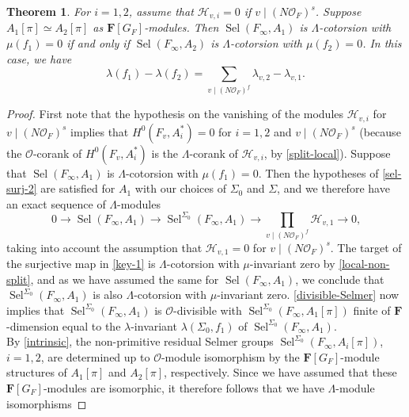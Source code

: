 \documentclass[12 pt]{amsart}
\theoremstyle{plain}
\newtheorem{thm}{Theorem}[section]
\theoremstyle{definition}
\numberwithin{equation}{section}
\numberwithin{table}{section}
\begin{document}
\begin{thm}
\label{main}
For $i=1,2$, assume that $\mathcal{H}_{v,i}=0$ if $v\mid(N\mathscr{O}_F)^s$. Suppose $A_1[\pi]\simeq A_2[\pi]$ as $\mathbf{F}[G_F]$-modules. Then $\operatorname{Sel}(F_\infty,A_1)$ is $\Lambda$-cotorsion with $\mu(f_1)=0$ if and only if $\operatorname{Sel}(F_\infty,A_2)$ is $\Lambda$-cotorsion with $\mu(f_2)=0$. In this case, we have
\begin{equation*}
\lambda(f_1)-\lambda(f_2)=\sum_{v\mid (N\mathscr{O}_F)^f}\lambda_{v,2}-\lambda_{v,1}\text{.}
\end{equation*}
\end{thm}
\begin{proof}
First note that the hypothesis on the vanishing of the modules $\mathcal{H}_{v,i}$ for $v\mid(N\mathscr{O}_F)^s$ implies that $H^0(F_v,A_i^*)=0$ for $i=1,2$ and $v\mid(N\mathscr{O}_F)^s$ (because the $\mathscr{O}$-corank of $H^0(F_v,A_i^*)$ is the $\Lambda$-corank of $\mathcal{H}_{v,i}$, by \cref{split-local}). Suppose that $\operatorname{Sel}(F_\infty,A_1)$ is $\Lambda$-cotorsion with $\mu(f_1)=0$. Then the hypotheses of \cref{sel-surj-2} are satisfied for $A_1$ with our choices of $\Sigma_0$ and $\Sigma$, and we therefore have an exact sequence of $\Lambda$-modules
\begin{equation}
\label{key-1}
0\rightarrow\operatorname{Sel}(F_\infty,A_1)\rightarrow\operatorname{Sel}^{\Sigma_0}(F_\infty,A_1)\rightarrow\prod_{v\mid(N\mathscr{O}_F)^f}\mathcal{H}_{v,1}\rightarrow 0\text{,}
\end{equation}
taking into account the assumption that $\mathcal{H}_{v,1}=0$ for $v\mid(N\mathscr{O}_F)^s$. The target of the surjective map in \cref{key-1} is $\Lambda$-cotorsion with $\mu$-invariant zero by \cref{local-non-split}, and as we have assumed the same for $\operatorname{Sel}(F_\infty,A_1)$, we conclude that $\operatorname{Sel}^{\Sigma_0}(F_\infty,A_1)$ is also $\Lambda$-cotorsion with $\mu$-invariant zero. \cref{divisible-Selmer} now implies that $\operatorname{Sel}^{\Sigma_0}(F_\infty,A_1)$ is $\mathscr{O}$-divisible with $\operatorname{Sel}^{\Sigma_0}(F_\infty,A_1[\pi])$ finite of $\mathbf{F}$-dimension equal to the $\lambda$-invariant $\lambda(\Sigma_0,f_1)$ of $\operatorname{Sel}^{\Sigma_0}(F_\infty,A_1)$. \\%
\indent By \cref{intrinsic}, the non-primitive residual Selmer groups $\operatorname{Sel}^{\Sigma_0}(F_\infty,A_i[\pi])$, $i=1,2$, are determined up to $\mathscr{O}$-module isomorphism by the $\mathbf{F}[G_F]$-module structures of $A_1[\pi]$ and $A_2[\pi]$, respectively. Since we have assumed that these $\mathbf{F}[G_F]$-modules are isomorphic, it therefore follows that we have $\Lambda$-module isomorphisms

\end{proof}
\end{document}
